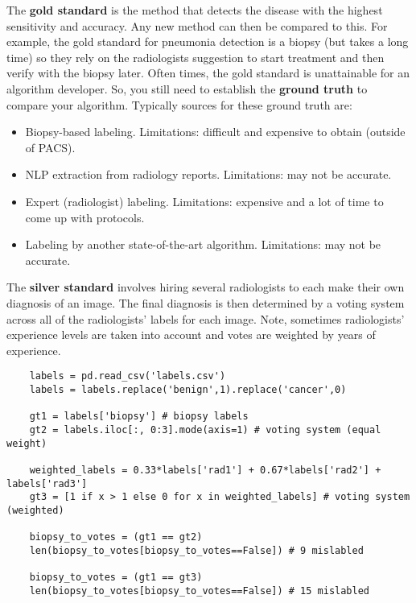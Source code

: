 \documentclass[11pt, a4paper]{article}
\begin{document}
	\noindent The \textbf{gold standard} is the method that detects the disease with the highest sensitivity and accuracy. Any new method can then be compared to this. For example, the gold standard for pneumonia detection is a biopsy (but takes a long time) so they rely on the radiologists suggestion to start treatment and then verify with the biopsy later. Often times, the gold standard is unattainable for an algorithm developer. So, you still need to establish the \textbf{ground truth} to compare your algorithm. Typically sources for these ground truth are:
	\begin{itemize}
		\item Biopsy-based labeling. Limitations: difficult and expensive to obtain (outside of PACS).
		\item NLP extraction from radiology reports. Limitations: may not be accurate.
		\item Expert (radiologist) labeling. Limitations: expensive and a lot of time to come up with protocols.
		\item Labeling by another state-of-the-art algorithm. Limitations: may not be accurate.
	\end{itemize}
	The \textbf{silver standard} involves hiring several radiologists to each make their own diagnosis of an image. The final diagnosis is then determined by a voting system across all of the radiologists' labels for each image. Note, sometimes radiologists' experience levels are taken into account and votes are weighted by years of experience. \vspace*{1mm}
	\begin{lstlisting}
	labels = pd.read_csv('labels.csv')
	labels = labels.replace('benign',1).replace('cancer',0)
	
	gt1 = labels['biopsy'] # biopsy labels
	gt2 = labels.iloc[:, 0:3].mode(axis=1) # voting system (equal weight)
	
	weighted_labels = 0.33*labels['rad1'] + 0.67*labels['rad2'] + labels['rad3']
	gt3 = [1 if x > 1 else 0 for x in weighted_labels] # voting system (weighted)
	
	biopsy_to_votes = (gt1 == gt2)
	len(biopsy_to_votes[biopsy_to_votes==False]) # 9 mislabled
	
	biopsy_to_votes = (gt1 == gt3)
	len(biopsy_to_votes[biopsy_to_votes==False]) # 15 mislabled	\end{lstlisting} \vspace*{1mm}
	
\end{document}
